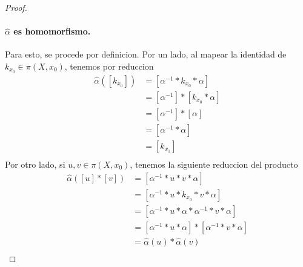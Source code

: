 {\begin{proof}
  \paragraph{\(\hat \alpha\) es homomorfismo.} Para esto, se procede por
  definicion. Por un lado, al mapear la identidad de \(k_{x_0} \in \pi
  (X, x_0) \), tenemos por reduccion
  \begin{align*}
    \hat \alpha ([k_{x_0}])
                 &= [\alpha^{-1} * k_{x_0} * \alpha] \\
                 &= [\alpha^{-1}] * [k_{x_0} * \alpha] \\
                 &= [\alpha^{-1}] * [\alpha] \\
                 &= [\alpha^{-1} * \alpha] \\
                 &= [k_{x_1}] \\
  \end{align*}
  Por otro lado, si \(u,v \in \pi (X, x_0) \), tenemos la siguiente
  reduccion del producto
  \begin{align*}
    \hat \alpha ([u] * [v]) &= [\alpha^{-1} * u * v * \alpha] \\
    &= [\alpha^{-1} * u * k_{x_0} * v * \alpha] \\
    &= [\alpha^{-1} * u * \alpha * \alpha^{-1} * v * \alpha] \\
    &= [\alpha^{-1} * u * \alpha ] * [ \alpha^{-1} * v * \alpha] \\
    &= \hat \alpha (u) * \hat \alpha (v) \\
  \end{align*}


\end{proof}}
